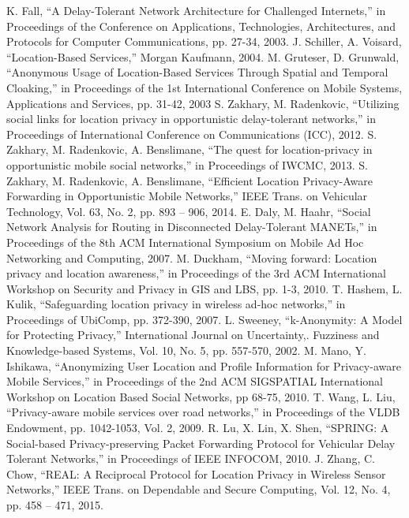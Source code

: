 \documentclass[conference]{IEEEtran}
\begin{document}
\begin{thebibliography}{00}

 K. Fall, ``A Delay-Tolerant Network Architecture for Challenged Internets,'' in Proceedings of the Conference on Applications, Technologies, Architectures, and Protocols for Computer Communications, pp. 27-34, 2003.
 J. Schiller, A. Voisard, ``Location-Based Services,'' Morgan Kaufmann, 2004.
 M. Gruteser, D. Grunwald, ``Anonymous Usage of Location-Based Services Through Spatial and Temporal Cloaking,'' in Proceedings of the 1st International Conference on Mobile Systems, Applications and Services, pp. 31-42, 2003
 S. Zakhary, M. Radenkovic, ``Utilizing social links for location privacy in opportunistic delay-tolerant networks,'' in Proceedings of International Conference on Communications (ICC), 2012.
 S. Zakhary, M. Radenkovic, A. Benslimane, ``The quest for location-privacy in opportunistic mobile social networks,'' in Proceedings of IWCMC, 2013.
 S. Zakhary, M. Radenkovic, A. Benslimane, ``Efficient Location Privacy-Aware Forwarding in Opportunistic Mobile Networks,''  IEEE Trans. on Vehicular Technology, Vol. 63, No. 2, pp. 893 – 906, 2014.
 E. Daly, M. Haahr, ``Social Network Analysis for Routing in Disconnected Delay-Tolerant MANETs,'' in Proceedings of the 8th ACM International Symposium on Mobile Ad Hoc Networking and Computing, 2007.
 M. Duckham, ``Moving forward: Location privacy and location awareness,'' in Proceedings of the 3rd ACM International Workshop on Security and Privacy in GIS and LBS, pp. 1-3, 2010.
 T. Hashem, L. Kulik, ``Safeguarding location privacy in wireless ad-hoc networks,'' in Proceedings of  UbiComp, pp. 372-390,  2007.
 L. Sweeney, ``k-Anonymity: A Model for Protecting Privacy,'' International Journal on Uncertainty,. Fuzziness and Knowledge-based Systems, Vol. 10, No. 5, pp. 557-570, 2002. 
 M. Mano, Y. Ishikawa, ``Anonymizing User Location and Profile Information for Privacy-aware Mobile Services,'' in Proceedings of the 2nd ACM SIGSPATIAL International Workshop on Location Based Social Networks, pp 68-75, 2010.
 T. Wang, L. Liu, ``Privacy-aware mobile services over road networks,'' in Proceedings of the VLDB Endowment, pp. 1042-1053, Vol. 2,  2009.
 R. Lu, X. Lin, X. Shen, ``SPRING: A Social-based Privacy-preserving Packet Forwarding Protocol for Vehicular Delay Tolerant Networks,'' in Proceedings of IEEE INFOCOM, 2010.
 J. Zhang, C. Chow, ``REAL: A Reciprocal Protocol for Location Privacy in Wireless Sensor Networks,'' IEEE Trans. on Dependable and Secure Computing, Vol. 12, No. 4, pp. 458 – 471, 2015.

\end{thebibliography}
\end{document}

